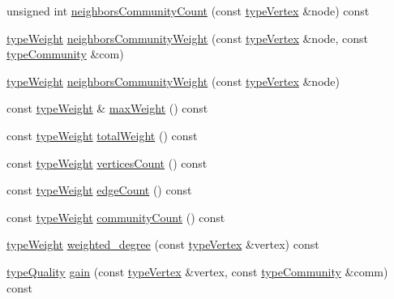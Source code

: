 \begin{DoxyCompactItemize}
\item 
unsigned int \hyperlink{classLouvain_a10483312016ad92ce019a80afdc8d6cf}{neighbors\+Community\+Count} (const \hyperlink{edge_8h_a5fbd20c46956d479cb10afc9855223f6}{type\+Vertex} \&node) const
\item 
\hyperlink{edge_8h_a2e7ea3be891ac8b52f749ec73fee6dd2}{type\+Weight} \hyperlink{classLouvain_a6e53ceb9865522beede2212de660f42c}{neighbors\+Community\+Weight} (const \hyperlink{edge_8h_a5fbd20c46956d479cb10afc9855223f6}{type\+Vertex} \&node, const \hyperlink{graphUndirectedGroupable_8h_a914da95c9ea7f14f4b7f875c36818556}{type\+Community} \&com)
\item 
\hyperlink{edge_8h_a2e7ea3be891ac8b52f749ec73fee6dd2}{type\+Weight} \hyperlink{classLouvain_a018414ffde9495cf575518702408669f}{neighbors\+Community\+Weight} (const \hyperlink{edge_8h_a5fbd20c46956d479cb10afc9855223f6}{type\+Vertex} \&node)
\item 
const \hyperlink{edge_8h_a2e7ea3be891ac8b52f749ec73fee6dd2}{type\+Weight} \& \hyperlink{classLouvain_aad63606a401df51dcd30f30224527381}{max\+Weight} () const
\item 
const \hyperlink{edge_8h_a2e7ea3be891ac8b52f749ec73fee6dd2}{type\+Weight} \hyperlink{classLouvain_aa772b7343d4a16534ef1dc45fa208815}{total\+Weight} () const
\item 
const \hyperlink{edge_8h_a2e7ea3be891ac8b52f749ec73fee6dd2}{type\+Weight} \hyperlink{classLouvain_a714b788d8473834915ae23c05eb2bf29}{vertices\+Count} () const
\item 
const \hyperlink{edge_8h_a2e7ea3be891ac8b52f749ec73fee6dd2}{type\+Weight} \hyperlink{classLouvain_a679f4a903e8d2199ab9ec206b999ce0a}{edge\+Count} () const
\item 
const \hyperlink{edge_8h_a2e7ea3be891ac8b52f749ec73fee6dd2}{type\+Weight} \hyperlink{classLouvain_a5e6c5b0c782e1a91c1ac8eccd17d1c3d}{community\+Count} () const
\item 
\hyperlink{edge_8h_a2e7ea3be891ac8b52f749ec73fee6dd2}{type\+Weight} \hyperlink{classLouvain_a55901b66258e0c727b8af1537846447b}{weighted\+\_\+degree} (const \hyperlink{edge_8h_a5fbd20c46956d479cb10afc9855223f6}{type\+Vertex} \&vertex) const
\item 
\hyperlink{qualityInterface_8h_a15a3ec6041e6e02d00d2eff22c20fd94}{type\+Quality} \hyperlink{classLouvain_ac95d6e53e46b6321aa02b80f0c69bd13}{gain} (const \hyperlink{edge_8h_a5fbd20c46956d479cb10afc9855223f6}{type\+Vertex} \&vertex, const \hyperlink{graphUndirectedGroupable_8h_a914da95c9ea7f14f4b7f875c36818556}{type\+Community} \&comm) const

\end{DoxyCompactItemize}
